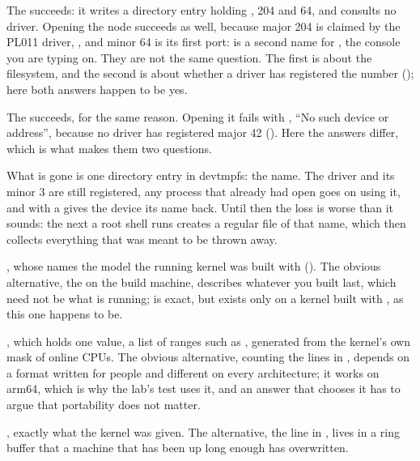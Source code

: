  The  succeeds: it writes a directory entry holding , 204 and 64, and
consults no driver. Opening the node succeeds as well, because major 204 is claimed by the PL011
driver, , and minor 64 is its first port:  is a second name for
, the console you are typing on. They are not the same question. The first is
about the filesystem, and the second is about whether a driver has registered the number
(); here both answers happen to be yes.

 The  succeeds, for the same reason. Opening it fails with , ``No
such device or address'', because no driver has registered major 42 (). Here the
answers differ, which is what makes them two questions.

 What is gone is one directory entry in devtmpfs: the name. The  driver and its
minor 3 are still registered, any process that already had  open goes on using it,
and  with a  gives the device its name back. Until then
the loss is worse than it sounds: the next  a root shell runs creates a regular
file of that name, which then collects everything that was meant to be thrown away.


 , whose  names the model the running kernel was
built with (). The obvious alternative, the  on the build machine,
describes whatever you built last, which need not be what is running;  is
exact, but exists only on a kernel built with , as this one happens to
be.

 , which holds one value, a list of ranges such as
, generated from the kernel's own mask of online CPUs. The obvious alternative, counting
the  lines in , depends on a format written for people and
different on every architecture; it works on arm64, which is why the lab's test uses it, and an
answer that chooses it has to argue that portability does not matter.

 , exactly what the kernel was given. The alternative, the
 line in , lives in a ring buffer that a machine that has been
up long enough has overwritten.


